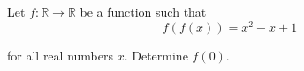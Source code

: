 Let $f:\mathbb{R}\to\mathbb{R}$ be a function such that\[f(f(x))=x^2-x+1\]

for all real numbers $x$. Determine $f(0)$.